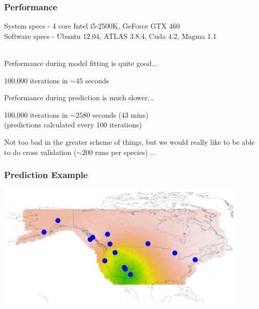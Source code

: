 \documentclass[slidestop,mathserif]{beamer}
\begin{document}

\begin{frame}
\frametitle{Performance}

{\small System specs - 4 core Intel i5-2500K, GeForce GTX 460} \\
{\small Software specs - Ubuntu 12.04, ATLAS 3.8.4, Cuda 4.2, Magma 1.1} \\
~\\
\pause

Performance during model fitting is quite good... \\

\begin{center}
100,000 iterations in $\sim 45$ seconds
\end{center}

\pause 

Performance during prediction is much slower... \\
\begin{center}
100,000 iterations in $\sim 2580$ seconds (43 mins) \\
(predictions calculated every 100 iterations)
\end{center}

\pause

Not too bad in the greater scheme of things, but we would really like to be able to do cross validation ($\sim 200$ runs per species) ...

\end{frame}


\begin{frame}
\frametitle{Prediction Example}

\begin{center}
\includegraphics[width=0.9\textwidth]{pics/HETH_Al3-1.pdf}
\end{center}
\end{frame}
\end{document}

